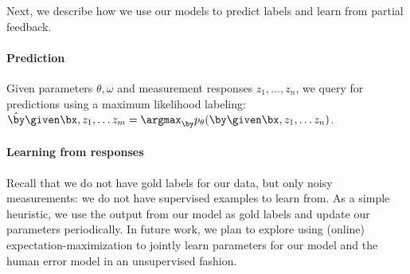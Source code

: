 Next, we describe how we use our models to predict labels and learn from partial feedback.

\paragraph{Prediction}
Given parameters $\theta, \omega$ and measurement responses $z_1, \ldots, z_n$, we query for predictions using a maximum likelihood labeling:
$\byt \given \bx, z_1, \ldots z_m = \argmax_{\by} \p(\by \given \bx, z_1, \ldots z_n)$.

\paragraph{Learning from responses}

Recall that we do not have gold labels for our data, but only noisy measurements: we do not have supervised examples to learn from. 
As a simple heuristic, we use the output from our model as gold labels and update our parameters periodically.  
In future work, we plan to explore using (online) expectation-maximization to jointly learn parameters for our model and the human error model in an unsupervised fashion.
